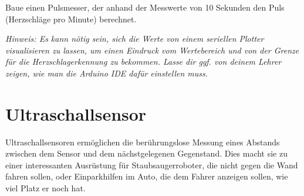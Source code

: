 \bigskip

\begin{projekt}[Pulsmesser]\label{proj:pulsmesser}
	Baue einen Pulsmesser, der anhand der Messwerte von 10 Sekunden den Puls (Herzschläge pro Minute) berechnet.
	
	\emph{Hinweis: Es kann nötig sein, sich die Werte von einem seriellen Plotter visualisieren zu lassen, um einen Eindruck vom Wertebereich und von der Grenze für die Herzschlagerkennung zu bekommen. Lasse dir ggf. von deinem Lehrer zeigen, wie man die Arduino IDE dafür einstellen muss.}
\end{projekt}

\newpage
\section{Ultraschallsensor}\label{sec:ultraschallsensor}

Ultraschallsensoren ermöglichen die berührungslose Messung eines Abstands zwischen dem Sensor und dem nächstgelegenen Gegenstand. Dies macht sie zu einer interessanten Ausrüstung für Staubsaugerroboter, die nicht gegen die Wand fahren sollen, oder Einparkhilfen im Auto, die dem Fahrer anzeigen sollen, wie viel Platz er noch hat.

